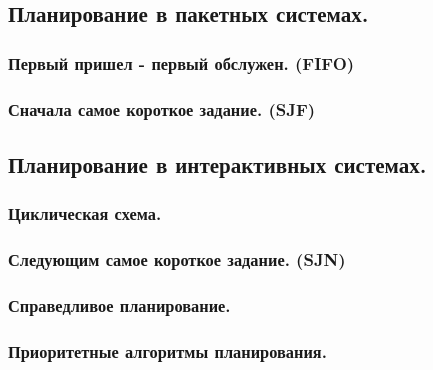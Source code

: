 \subsection{Планирование в пакетных системах.}
\subsubsection{Первый пришел - первый обслужен. (FIFO)}

\subsubsection{Сначала самое короткое задание. (SJF)}


\subsection{Планирование в интерактивных системах.}
\subsubsection{Циклическая схема.}

\subsubsection{Следующим самое короткое задание. (SJN)}


\subsubsection{Справедливое планирование.}

\subsubsection{Приоритетные алгоритмы планирования.}


